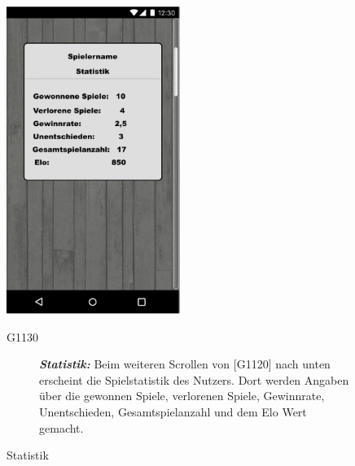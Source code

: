 \documentclass[parskip=full]{scrartcl}
\begin{document}
\begin{figure}[htp]
	\begin{minipage}[t]{6cm}
		\vspace{0pt}
		\includegraphics[height=100mm]{statistik.png}
		\caption{Statistik}
		\label{fig:Statistik}
	\end{minipage}
	\hfill
	\begin{minipage}[t]{6cm}
		\vspace{0pt}
		\begin{description}
			\item[G1130] \textbf{\textit{Statistik: }} Beim weiteren Scrollen von [G1120] nach unten erscheint die Spielstatistik des Nutzers. Dort werden Angaben über die gewonnen Spiele, verlorenen Spiele, Gewinnrate, Unentschieden, Gesamtspielanzahl und dem Elo Wert gemacht.
		\end{description}
	\end{minipage}
\end{figure}
\newpage
\end{document}
